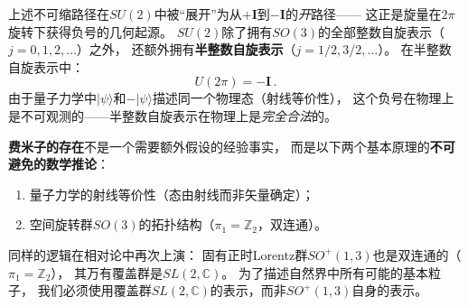 上述不可缩路径在$SU(2)$中被``展开''为从$+\mathbf{I}$到$-\mathbf{I}$的\emph{开}路径——
这正是旋量在$2\pi$旋转下获得负号的几何起源。
$SU(2)$除了拥有$SO(3)$的全部整数自旋表示（$j=0,1,2,\ldots$）之外，
还额外拥有\textbf{半整数自旋表示}（$j=1/2,3/2,\ldots$）。
在半整数自旋表示中：
\begin{equation}
    U(2\pi) = -\mathbf{I}\,.
\end{equation}
由于量子力学中$|\psi\rangle$和$-|\psi\rangle$描述同一个物理态（射线等价性），
这个负号在物理上是不可观测的——半整数自旋表示在物理上是\emph{完全合法}的。

\begin{tcolorbox}[colback=white!5, colframe=black!45,]
\textbf{费米子的存在}不是一个需要额外假设的经验事实，
而是以下两个基本原理的\textbf{不可避免的数学推论}：
\begin{enumerate}
    \item 量子力学的射线等价性（态由射线而非矢量确定）；
    \item 空间旋转群$SO(3)$的拓扑结构（$\pi_1 = \mathbb{Z}_2$，双连通）。
\end{enumerate}
同样的逻辑在相对论中再次上演：
固有正时Lorentz群$SO^+(1,3)$也是双连通的（$\pi_1=\mathbb{Z}_2$），
其万有覆盖群是$SL(2,\mathbb{C})$。
为了描述自然界中所有可能的基本粒子，
我们必须使用覆盖群$SL(2,\mathbb{C})$的表示，而非$SO^+(1,3)$自身的表示。
\end{tcolorbox}


